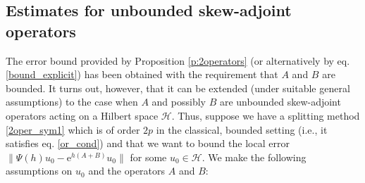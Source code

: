 \documentclass[11pt]{article}
\newcommand{\e}{\ensuremath{\mathrm{e}}}
\begin{document}
\subsection{Estimates for unbounded skew-adjoint operators} 


The error bound provided by Proposition \ref{p:2operators} (or alternatively by eq. \eqref{bound_explicit})
has been obtained with the requirement that $A$ and $B$ are bounded. It turns out, however, that it can be extended (under suitable
general assumptions) to the case
when $A$ and possibly $B$ are unbounded 
skew-adjoint operators acting on
a Hilbert space $\mathcal{H}$. Thus, suppose we have a splitting method \eqref{2oper_sym1} which is of order $2p$ in the classical, bounded setting (i.e., it satisfies eq. \eqref{or_cond}) and that we want to bound the local error
 $\|\Psi(h) u_0 - \e^{h(A+B)} u_0 \| $ for some $u_0 \in \mathcal{H}$.
 We make
the following assumptions on $u_0$ and the operators $A$ and $B$:
\end{document}
